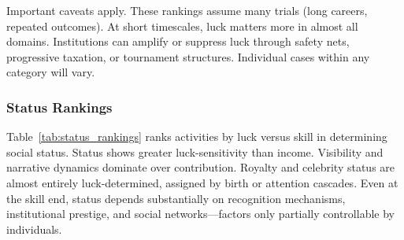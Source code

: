 Important caveats apply. These rankings assume many trials (long careers,
repeated outcomes). At short timescales, luck matters more in almost all
domains. Institutions can amplify or suppress luck through safety nets, progressive
taxation, or tournament structures. Individual cases within any category
will vary.

\subsubsection{Status Rankings}

Table~\ref{tab:status_rankings} ranks activities by luck versus skill in
determining social status. Status shows greater luck-sensitivity than income.
Visibility and narrative dynamics dominate over contribution. Royalty and
celebrity status are almost entirely luck-determined, assigned by birth
or attention cascades. Even at the skill end, status depends
substantially on recognition mechanisms, institutional prestige, and
social networks—factors only partially controllable by individuals.

